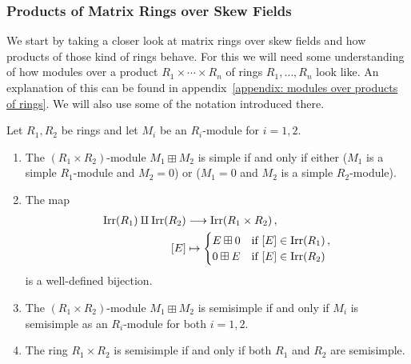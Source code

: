 \subsubsection{Products of Matrix Rings over Skew Fields}


\begin{fluff}
  We start by taking a closer look at matrix rings over skew fields and how products of those kind of rings behave.
  For this we will need some understanding of how modules over a product  $R_1 \times \dotsb \times R_n$ of rings $R_1, \dotsc, R_n$ look like.
  An explanation of this can be found in appendix~\ref{appendix: modules over products of rings}.
  We will also use some of the notation introduced there.
\end{fluff}


\begin{proposition}
  \label{proposition: product of semisimple}
  Let $R_1, R_2$ be rings and let $M_i$ be an $R_i$-module for $i = 1, 2$.
  \begin{enumerate}
    \item
      \label{enumerate: when boxplus is simple}
      The $(R_1 \times R_2)$-module $M_1 \boxplus M_2$ is simple if and only if either ($M_1$ is a simple $R_1$-module and $M_2 = 0$) or ($M_1 = 0$ and $M_2$ is a simple $R_2$-module).
    \item
      The map
      \begin{align*}
                  \operatorname{Irr}(R_1) \amalg \operatorname{Irr}(R_2)
        &\longrightarrow  \operatorname{Irr}(R_1 \times R_2) \,,
        \\
                  [E]
        &\mapsto  \begin{cases}
                    E \boxplus 0  & \text{if $[E] \in \operatorname{Irr}(R_1)$} \,, \\
                    0 \boxplus E  & \text{if $[E] \in \operatorname{Irr}(R_2)$}
                  \end{cases}
      \end{align*}
      is a well-defined bijection.
    \item
      \label{enumerate: when boxplus is semisimple}
      The $(R_1 \times R_2)$-module $M_1 \boxplus M_2$ is semisimple if and only if $M_i$ is semisimple as an $R_i$-module for both $i = 1, 2$.
    \item
      The ring $R_1 \times R_2$ is semisimple if and only if both $R_1$ and $R_2$ are semisimple.
  \end{enumerate}
\end{proposition}


